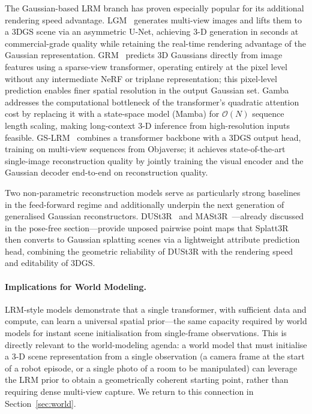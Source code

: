 The Gaussian-based LRM branch has proven especially popular for its additional
rendering speed advantage.
LGM~\citep{tang2024lgm} generates multi-view images and lifts them to a 3DGS
scene via an asymmetric U-Net, achieving 3-D generation in seconds at
commercial-grade quality while retaining the real-time rendering advantage of
the Gaussian representation.
GRM~\citep{xu2024grm} predicts 3D Gaussians directly from image features using
a sparse-view transformer, operating entirely at the pixel level without any
intermediate NeRF or triplane representation; this pixel-level prediction
enables finer spatial resolution in the output Gaussian set.
Gamba~\citep{he2024gamba} addresses the computational bottleneck of the
transformer's quadratic attention cost by replacing it with a state-space
model (Mamba) for $\mathcal{O}(N)$ sequence length scaling, making long-context
3-D inference from high-resolution inputs feasible.
GS-LRM~\citep{zhang2024gslrm} combines a transformer backbone with a 3DGS
output head, training on multi-view sequences from Objaverse; it achieves
state-of-the-art single-image reconstruction quality by jointly training
the visual encoder and the Gaussian decoder end-to-end on reconstruction quality.

Two non-parametric reconstruction models serve as particularly strong baselines
in the feed-forward regime and additionally underpin the next generation of
generalised Gaussian reconstructors.
DUSt3R~\citep{wang2024dust3r} and MASt3R~\citep{leroy2024mast3r}---already
discussed in the pose-free section---provide unposed pairwise point maps that
Splatt3R~\citep{smart2024splatt3r} then converts to Gaussian splatting scenes
via a lightweight attribute prediction head, combining the geometric reliability
of DUSt3R with the rendering speed and editability of 3DGS.

\paragraph{Implications for World Modeling.}
LRM-style models demonstrate that a single transformer, with sufficient data
and compute, can learn a universal spatial prior---the same capacity required
by world models for instant scene initialisation from single-frame observations.
This is directly relevant to the world-modeling agenda: a world model that
must initialise a 3-D scene representation from a single observation
(a camera frame at the start of a robot episode, or a single photo of a room
to be manipulated) can leverage the LRM prior to obtain a geometrically coherent
starting point, rather than requiring dense multi-view capture.
We return to this connection in Section~\ref{sec:world}.

